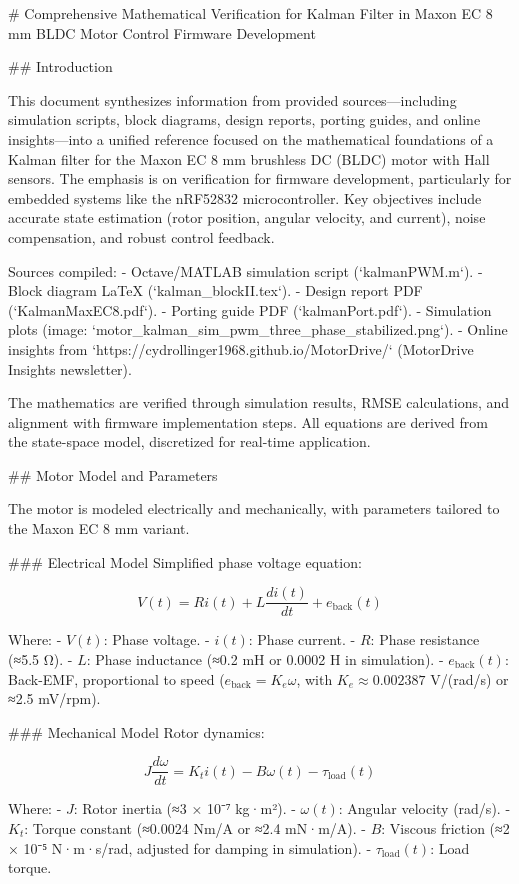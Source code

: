 # Comprehensive Mathematical Verification for Kalman Filter in Maxon EC 8 mm BLDC Motor Control Firmware Development

## Introduction

This document synthesizes information from provided sources—including simulation scripts, block diagrams, design reports, porting guides, and online insights—into a unified reference focused on the mathematical foundations of a Kalman filter for the Maxon EC 8 mm brushless DC (BLDC) motor with Hall sensors. The emphasis is on verification for firmware development, particularly for embedded systems like the nRF52832 microcontroller. Key objectives include accurate state estimation (rotor position, angular velocity, and current), noise compensation, and robust control feedback.

Sources compiled:
- Octave/MATLAB simulation script (`kalmanPWM.m`).
- Block diagram LaTeX (`kalman_blockII.tex`).
- Design report PDF (`KalmanMaxEC8.pdf`).
- Porting guide PDF (`kalmanPort.pdf`).
- Simulation plots (image: `motor_kalman_sim_pwm_three_phase_stabilized.png`).
- Online insights from `https://cydrollinger1968.github.io/MotorDrive/` (MotorDrive Insights newsletter).

The mathematics are verified through simulation results, RMSE calculations, and alignment with firmware implementation steps. All equations are derived from the state-space model, discretized for real-time application.

## Motor Model and Parameters

The motor is modeled electrically and mechanically, with parameters tailored to the Maxon EC 8 mm variant.

### Electrical Model
Simplified phase voltage equation:

\[ V(t) = R i(t) + L \frac{di(t)}{dt} + e_{\text{back}}(t) \]

Where:
- \( V(t) \): Phase voltage.
- \( i(t) \): Phase current.
- \( R \): Phase resistance (≈5.5 Ω).
- \( L \): Phase inductance (≈0.2 mH or 0.0002 H in simulation).
- \( e_{\text{back}}(t) \): Back-EMF, proportional to speed (\( e_{\text{back}} = K_e \omega \), with \( K_e \approx 0.002387 \) V/(rad/s) or ≈2.5 mV/rpm).

### Mechanical Model
Rotor dynamics:

\[ J \frac{d\omega}{dt} = K_t i(t) - B \omega(t) - \tau_{\text{load}}(t) \]

Where:
- \( J \): Rotor inertia (≈3 × 10⁻⁷ kg·m²).
- \( \omega(t) \): Angular velocity (rad/s).
- \( K_t \): Torque constant (≈0.0024 Nm/A or ≈2.4 mN·m/A).
- \( B \): Viscous friction (≈2 × 10⁻⁵ N·m·s/rad, adjusted for damping in simulation).
- \( \tau_{\text{load}}(t) \): Load torque.

